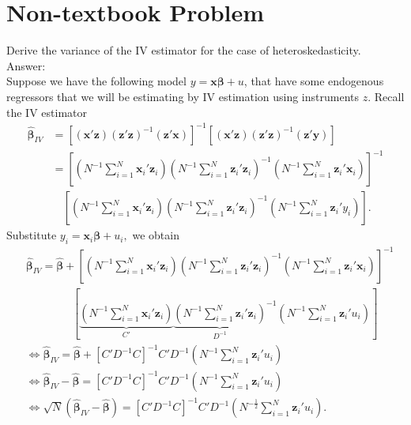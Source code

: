 \documentclass[10pt]{article}
\begin{document}
\section*{Non-textbook Problem}
Derive the variance of the IV estimator for the case of heteroskedasticity.
\\ Answer:\\
Suppose we have the following model $y=\textbf{x}\pmb{\beta}+u$, that have some endogenous regressors that we will be estimating by IV estimation using instruments $z$. Recall the IV estimator
\begin{align*}
    \hat{\pmb{\beta}}_{IV}&=[(\textbf{x}'\textbf{z})(\textbf{z}'\textbf{z})^{-1}(\textbf{z}'\textbf{x})]^{-1}[(\textbf{x}'\textbf{z})(\textbf{z}'\textbf{z})^{-1}(\textbf{z}'\textbf{y})]\\
    &=\left[\left(N^{-1}\sum_{i=1}^N\textbf{x}_i'\textbf{z}_i\right)\left(N^{-1}\sum_{i=1}^N\textbf{z}_i'\textbf{z}_i\right)^{-1}\left(N^{-1}\sum_{i=1}^N\textbf{z}_i'\textbf{x}_i\right)\right]^{-1}\\
    &\hspace{12pt}  \left[\left(N^{-1}\sum_{i=1}^N\textbf{x}_i'\textbf{z}_i\right)\left(N^{-1}\sum_{i=1}^N\textbf{z}_i'\textbf{z}_i\right)^{-1}\left(N^{-1}\sum_{i=1}^N\textbf{z}_i'y_i\right)\right].
\end{align*}
Substitute $y_i=\textbf{x}_i\pmb{\beta}+u_i,$ we obtain
\begin{align*}
    &\hat{\pmb{\beta}}_{IV}=\hat{\pmb{\beta}}+\left[\left(N^{-1}\sum_{i=1}^N\textbf{x}_i'\textbf{z}_i\right)\left(N^{-1}\sum_{i=1}^N\textbf{z}_i'\textbf{z}_i\right)^{-1}\left(N^{-1}\sum_{i=1}^N\textbf{z}_i'\textbf{x}_i\right)\right]^{-1}\\
    & \hspace{50pt}  \left[\underbrace{\left(N^{-1}\sum_{i=1}^N\textbf{x}_i'\textbf{z}_i\right)}_{\displaystyle C'}{\underbrace{\left(N^{-1}\sum_{i=1}^N\textbf{z}_i'\textbf{z}_i\right)}_{\displaystyle D^{-1}}}^{-1}\left(N^{-1}\sum_{i=1}^N\textbf{z}_i'u_i\right)\right]\\
    &\Leftrightarrow\hat{\pmb{\beta}}_{IV}=\hat{\pmb{\beta}}+[C'D^{-1}C]^{-1}C'D^{-1}\left(N^{-1}\sum_{i=1}^N\textbf{z}_i'u_i\right) \\
    &\Leftrightarrow\hat{\pmb{\beta}}_{IV}-\hat{\pmb{\beta}}=[C'D^{-1}C]^{-1}C'D^{-1}\left(N^{-1}\sum_{i=1}^N\textbf{z}_i'u_i\right)\\
    &\Leftrightarrow\sqrt{N}(\hat{\pmb{\beta}}_{IV}-\hat{\pmb{\beta}})=[C'D^{-1}C]^{-1}C'D^{-1}\left(N^{-\frac{1}{2}}\sum_{i=1}^N\textbf{z}_i'u_i\right).
\end{align*}
\end{document}
